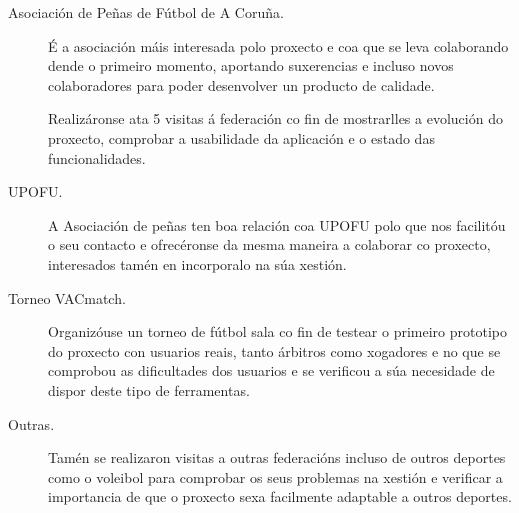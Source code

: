   \begin{description}

  \item [Asociación de Peñas de Fútbol de A Coruña.]
  É a asociación máis interesada polo proxecto e coa que se leva colaborando 
dende o primeiro momento, aportando suxerencias e incluso novos colaboradores 
para poder desenvolver un producto de calidade.

  Realizáronse ata 5 visitas á federación co fin de mostrarlles a evolución do 
proxecto, comprobar a usabilidade da aplicación e o estado das funcionalidades.

  \item [UPOFU.]
  A Asociación de peñas ten boa relación coa UPOFU polo que nos facilitóu o seu 
contacto e ofrecéronse da mesma maneira a colaborar co proxecto, interesados 
tamén en incorporalo na súa xestión.

  \item [Torneo VACmatch.]
  Organizóuse un torneo de fútbol sala co fin de testear o primeiro prototipo 
do proxecto con usuarios reais, tanto árbitros como xogadores e no que se 
comprobou as dificultades dos usuarios e se verificou a súa necesidade de 
dispor deste tipo de ferramentas.

  \item [Outras.]
  Tamén se realizaron visitas a outras federacións incluso de outros deportes 
como o voleibol para comprobar os seus problemas na xestión e verificar a 
importancia de que o proxecto sexa facilmente adaptable a outros deportes.

  \end{description}

